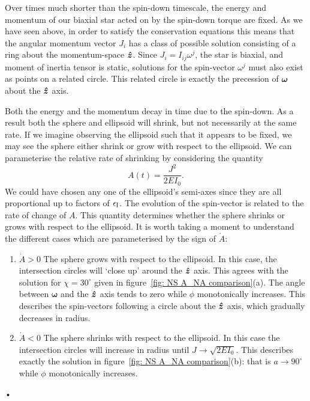 \documentclass[../full_thesis/full_thesis.tex]{subfiles}
\begin{document}
Over times much shorter than the spin-down timescale, the energy and momentum
of our biaxial star acted on by the spin-down torque are fixed. As we have seen
above, in order to satisfy the conservation equations this means that the
angular momentum vector $J_i$ has a class of possible solution consisting of a
ring about the momentum-space $\boldsymbol{\hat{z}}$.  Since $J_{i}=I_{ij}\omega^{j}$, the star
is biaxial, and moment of inertia tensor is static, solutions for the spin-vector $\omega^j$
must also exist as points on a related circle. This related circle is exactly
the precession of $\boldsymbol{\omega}$ about the $\boldsymbol{\hat{z}}$ axis.

Both the energy and the momentum decay in time
due to the spin-down. As a result both the sphere and ellipsoid will shrink, but
not necessarily at the same rate. If we imagine observing the ellipsoid such
that it appears to be fixed, we may see the sphere either shrink or grow with
respect to the ellipsoid. We can parameterise the relative rate of shrinking by
considering the quantity
\begin{equation}
A(t)  = \frac{J^{2}} {2EI_{0}}.
\label{eqn: A}
\end{equation}
We could have chosen any one of the ellipsoid's semi-axes since they are all
proportional up to factors of $\epsilon_{\mathrm{I}}$. The evolution of the spin-vector is
related to the rate of change of $A$.
This quantity determines whether the sphere shrinks or grows with respect to
the ellipsoid. It is worth taking a moment to understand the different cases
which are parameterised by the sign of $\dot{A}$:
\begin{enumerate}
\item $\dot{A}>0$ The sphere grows with respect to the ellipsoid. In this case,
    the intersection circles will `close up' around the $\boldsymbol{\hat{z}}$ axis. This
    agrees with the solution for $\chi=30^{\circ}$ given in
    figure~\ref{fig: NS A_NA comparison}(a). The angle between
    $\boldsymbol{\omega}$ and the $\boldsymbol{\hat{z}}$ axis tends to zero while $\phi$
    monotonically increases. This describes the spin-vectors following a circle
    about the $\boldsymbol{\hat{z}}$ axis, which gradually decreases in radius.
\item $\dot{A}<0$ The sphere shrinks with respect to the ellipsoid. In this
    case the intersection circles will increase in radius until $J\rightarrow
    \sqrt{2EI_{0}}$. This describes exactly the solution in
    figure~\ref{fig: NS A_NA comparison}(b): that is $a\rightarrow
    90^{\circ}$ while $\phi$ monotonically increases.
\end{enumerate}•
\end{document}

